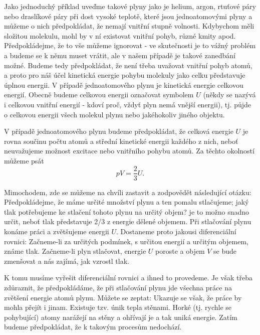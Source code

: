    Jako jednoduchý příklad uveďme takové plyny jako je helium, argon, rtuťové páry nebo draslíkové
    páry při dost vysoké teplotě, které jsou jednoatomovými plyny a můžeme o nich předpokládat, že
    nemají vnitřní stupně volnosti. Kdybychom měli složitou molekulu, mohl by v ní existovat vnitřní
    pohyb, různé kmity apod. Předpokládejme, že to vše můžeme ignorovat - ve skutečnosti je to vážný
    problém a budeme se k němu muset vrátit, ale v našem případě je takové zanedbání možné. Budeme
    tedy předpokládat, že není třeba uvažovat vnitřní pohyb atomů, a proto pro náš účel kinetická
    energie pohybu molekuly jako celku představuje úplnou energii. V případě jednoatomového plynu je
    kinetická energie celkovou energií. Obecně budeme celkovou energii označovat symbolem \(U\)
    (někdy se nazývá i celkovou vnitřní energií - kdoví proč, vždyť plyn nemá vnější energii), tj.
    půjde o celkovou energii všech molekul plynu nebo jakéhokoliv jiného objektu.

    V případě jednoatomového plynu budeme předpokládat, že celková energie \(U\) je rovna součinu
    počtu atomů a střední kinetické energii každého z nich, neboť neuvažujeme možnost excitace nebo
    vnitřního pohybu atomů. Za těchto okolností můžeme psát
    \begin{equation}\label{fyz:eq621}
      pV = \frac{2}{3}U.
    \end{equation}

    Mimochodem, zde se můžeme na chvíli zastavit a zodpovědět následující otázku: Předpokládejme, že
    máme určité množství plynu a ten pomalu stlačujeme; jaký tlak potřebujeme ke stlačení tohoto
    plynu na určitý objem? je to možno snadno určit, neboť tlak představuje \num{2/3} z energie
    dělené objemem. Při stlačování plynu konáme práci a zvětšujeme energii \(U\). Dostaneme proto
    jakousi diferenciální rovnici: Začneme-li za určitých podmínek, s určitou energií a určitým
    objemem, známe tlak. Začneme-li plyn stlačovat, energie \(U\) poroste a objem \(V\) se bude
    zmenšovat a nás zajímá, jak vzrostl tlak.

    K tomu musíme vyřešit diferenciální rovnici a ihned to provedeme. Je však třeba zdůraznit, že
    předpokládáme, že při stlačování plynu jde všechna práce na zvětšení energie atomů plynu. Můžete
    se zeptat:  Ukazuje se
    však, že práce by mohla přejít i jinam. Existuje tzv. únik tepla stěnami. Horké (tj. rychle se
    pohybující) atomy narážejí na stěny a ohřívají je a tak uniká energie. Zatím budeme
    předpokládat, že k takovým procesům nedochází.

